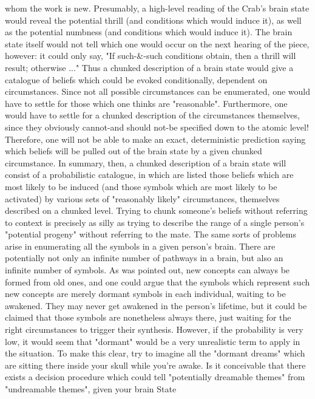 whom the work is new. Presumably, a high-level reading of the Crab's brain state would
reveal the potential thrill (and conditions which would induce it), as well as the potential
numbness (and conditions which would induce it). The brain state itself would not tell
which one would occur on the next hearing of the piece, however: it could only say, "If
such-\&-such conditions obtain, then a thrill will result; otherwise ..."
        Thus a chunked description of a brain state would give a catalogue of beliefs
which could be evoked conditionally, dependent on circumstances. Since not all possible
circumstances can be enumerated, one would have to settle for those which one thinks are
"reasonable". Furthermore, one would have to settle for a chunked description of the
circumstances themselves, since they obviously cannot-and should not-be specified down
to the atomic level! Therefore, one will not be able to make an exact, deterministic
prediction saying which beliefs will be pulled out of the brain state by a given chunked
circumstance. In summary, then, a chunked description of a brain state will consist of a
probabilistic catalogue, in which are listed those beliefs which are most likely to be
induced (and those symbols which are most likely to be activated) by various sets of
"reasonably likely" circumstances, themselves described on a chunked level. Trying to
chunk someone's beliefs without referring to context is precisely as silly as trying to
describe the range of a single person's "potential progeny" without referring to the mate.
        The same sorts of problems arise in enumerating all the symbols in a given
person's brain. There are potentially not only an infinite number of pathways in a brain,
but also an infinite number of symbols. As was pointed out, new concepts can always be
formed from old ones, and one could argue that the symbols which represent such new
concepts are merely dormant symbols in each individual, waiting to be awakened. They
may never get awakened in the person's lifetime, but it could be claimed that those
symbols are nonetheless always there, just waiting for the right circumstances to trigger
their synthesis. However, if the probability is very low, it would seem that "dormant"
would be a very unrealistic term to apply in the situation. To make this clear, try to
imagine all the "dormant dreams" which are sitting there inside your skull while you're
awake. Is it conceivable that there exists a decision procedure which could tell
"potentially dreamable themes" from "undreamable themes", given your brain State

